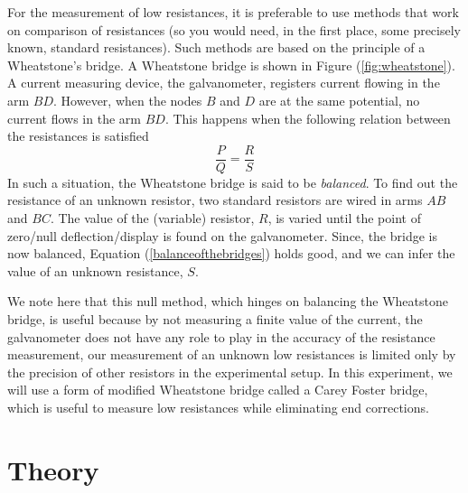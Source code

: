 \begin{refsection}
For the measurement of low resistances, it is preferable to use methods that work on comparison of resistances (so you would need, in the first place, some precisely known, standard resistances). Such methods are based on the principle of a Wheatstone's bridge. A Wheatstone bridge is shown in Figure (\ref{fig:wheatstone}). A current measuring device, the galvanometer, registers current flowing in the arm $BD$. However, when the nodes $B$ and $D$ are at the same potential, no current flows in the arm $BD$. This happens when the following relation between the resistances is satisfied
\begin{equation}
    \frac{P}{Q}  =\frac{R}{S}
    \label{balanceofthebridges}
\end{equation}
In such a situation, the Wheatstone bridge is said to be \textit{balanced}.
To find out the resistance of an unknown resistor, two standard resistors are wired in arms $AB$ and $BC$. The value of the (variable) resistor, $R$, is varied until the point of zero/null deflection/display is found on the galvanometer. Since, the bridge is now balanced, Equation (\ref{balanceofthebridges}) holds good, and we can infer the value of an unknown resistance, $S$. 

We note here that this null method, which hinges on balancing the Wheatstone bridge, is useful because by not measuring a finite value of the current, the galvanometer does not have any role to play in the accuracy of the resistance measurement, our measurement of an unknown low resistances is limited only by the precision of other resistors in the experimental setup. In this experiment, we will use a form of modified Wheatstone bridge called a Carey Foster bridge, which is useful to measure low resistances while eliminating end corrections.





\section*{Theory}


\end{refsection}
